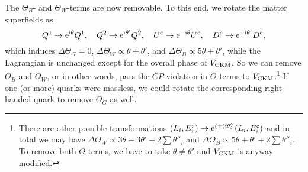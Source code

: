 \documentclass[CheatSheet]{subfiles}
\begin{document}
The $\Theta_B$- and $\Theta_W$-terms are now removable.
To this end, we rotate the matter superfields as
\begin{equation}
 Q^1\to\mathop{}\!\mathrm{e}^{\mathrm{i}\theta}Q^1,\quad
 Q^2\to\mathop{}\!\mathrm{e}^{\mathrm{i}\theta'}Q^2,\quad
 U^{\mathrm{c}}\to\mathop{}\!\mathrm{e}^{-\mathrm{i}\theta}U^{\mathrm{c}},\quad
 D^{\mathrm{c}}\to\mathop{}\!\mathrm{e}^{-\mathrm{i}\theta'}D^{\mathrm{c}},
\end{equation}
which induces
$\Delta \Theta_G=0$,
$\Delta \Theta_W\propto \theta+\theta'$,
and
$\Delta \Theta_B\propto 5\theta+\theta'$, while the Lagrangian is unchanged except for the overall phase of $V_{\mathrm{CKM}}$.
So we can remove $\Theta_B$ and $\Theta_W$, or in other words, pass the $CP$-violation in $\Theta$-terms to $V_{\mathrm{CKM}}$.\footnote{
There are other possible transformations $(L_i,E^{\mathrm{c}}_i)\to \mathop{}\!\mathrm{e}^{(\pm)\mathrm{i}\theta''_i}(L_i,E^{\mathrm{c}}_i)$ and in total we may have $\Delta\Theta_W \propto 3\theta+3\theta'+2\sum\theta''_i$ and
 $\Delta\Theta_B \propto 5\theta+\theta'+2\sum\theta''_i$.
To remove both $\Theta$-terms, we have to take $\theta\neq\theta'$ and $V_{\mathrm{CKM}}$ is anyway modified.}
If one (or more) quarks were massless, we could rotate the corresponding right-handed quark to remove $\Theta_G$ as well.
\end{document}
